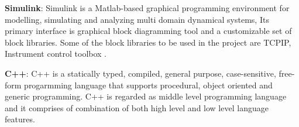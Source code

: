 \documentclass{listhesis}
\begin{document}
\par
\textbf{Simulink}: Simulink is a Matlab-based graphical programming environment for modelling, simulating and analyzing multi domain dynamical systems, Its primary interface is graphical block diagramming tool and a customizable set of block libraries. Some of the block libraries to be used in the project are TCPIP, Instrument control toolbox .
\\
\par
\textbf{C++}: C++ is a statically typed, compiled, general purpose, case-sensitive, free-form  progarmming language that supports procedural, object oriented and generic programming. C++ is regarded as middle level programming language and it comprises of combination of both high level and low level language features. 
\\
\par
\end{document}
